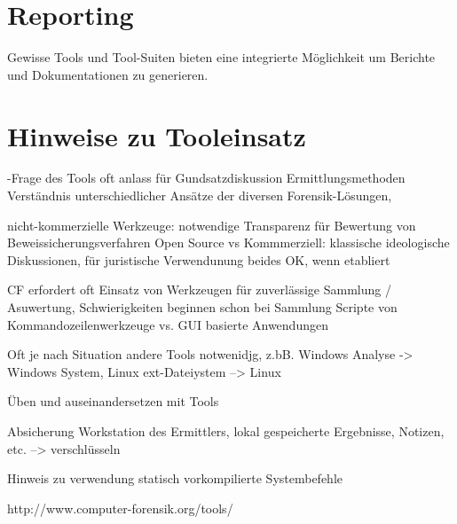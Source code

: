 \section{Reporting}
Gewisse Tools und Tool-Suiten bieten eine integrierte Möglichkeit um Berichte und Dokumentationen zu generieren. 


\section{Hinweise zu Tooleinsatz}
-Frage des Tools oft anlass für Gundsatzdiskussion Ermittlungsmethoden
Verständnis unterschiedlicher Ansätze der diversen Forensik-Lösungen, 

nicht-kommerzielle Werkzeuge: notwendige Transparenz für Bewertung von Beweissicherungsverfahren
Open Source vs Kommmerziell: klassische ideologische Diskussionen, für juristische Verwendunung beides OK, wenn etabliert

CF erfordert oft Einsatz von Werkzeugen für zuverlässige Sammlung / Asuwertung, Schwierigkeiten beginnen schon bei Sammlung Scripte von Kommandozeilenwerkzeuge vs. GUI basierte Anwendungen

Oft je nach Situation andere Tools notwenidjg, z.bB. Windows Analyse -> Windows System, Linux ext-Dateiystem --> Linux

Üben und auseinandersetzen mit Tools

Absicherung Workstation des Ermittlers, lokal gespeicherte Ergebnisse, Notizen, etc. --> verschlüsseln

Hinweis zu verwendung statisch vorkompilierte Systembefehle

http://www.computer-forensik.org/tools/




